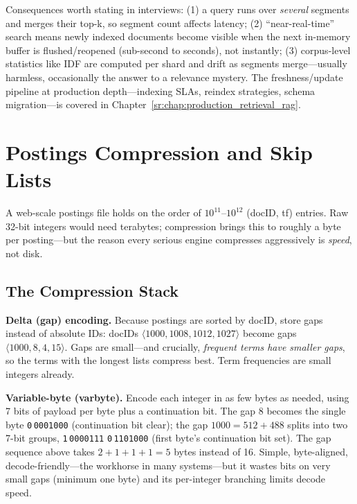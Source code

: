 Consequences worth stating in interviews: (1) a query runs over \emph{several} segments and merges their top-k, so segment count affects latency; (2) ``near-real-time'' search means newly indexed documents become visible when the next in-memory buffer is flushed/reopened (sub-second to seconds), not instantly; (3) corpus-level statistics like IDF are computed per shard and drift as segments merge---usually harmless, occasionally the answer to a relevance mystery. The freshness/update pipeline at production depth---indexing SLAs, reindex strategies, schema migration---is covered in Chapter~\ref{sr:chap:production_retrieval_rag}.

\section{Postings Compression and Skip Lists}
\label{sr:sec:compression}

A web-scale postings file holds on the order of $10^{11}$--$10^{12}$ (docID, tf) entries. Raw 32-bit integers would need terabytes; compression brings this to roughly a byte per posting---but the reason every serious engine compresses aggressively is \emph{speed}, not disk.

\subsection{The Compression Stack}

\textbf{Delta (gap) encoding.} Because postings are sorted by docID, store gaps instead of absolute IDs: docIDs $\langle 1000, 1008, 1012, 1027 \rangle$ become gaps $\langle 1000, 8, 4, 15 \rangle$. Gaps are small---and crucially, \emph{frequent terms have smaller gaps}, so the terms with the longest lists compress best. Term frequencies are small integers already.

\textbf{Variable-byte (varbyte).} Encode each integer in as few bytes as needed, using 7 bits of payload per byte plus a continuation bit. The gap $8$ becomes the single byte \texttt{0}\,\texttt{0001000} (continuation bit clear); the gap $1000 = 512 + 488$ splits into two 7-bit groups, \texttt{1}\,\texttt{0000111} \texttt{0}\,\texttt{1101000} (first byte's continuation bit set). The gap sequence above takes $2+1+1+1 = 5$ bytes instead of 16. Simple, byte-aligned, decode-friendly---the workhorse in many systems---but it wastes bits on very small gaps (minimum one byte) and its per-integer branching limits decode speed.

